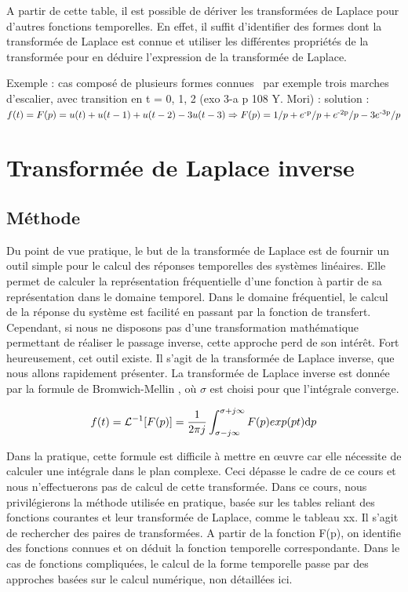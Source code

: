 \documentclass[]{book}
\begin{document}
{	A partir de cette table, il est possible de dériver les transformées de Laplace pour d'autres fonctions temporelles. En effet, il suffit d'identifier des formes dont la transformée de Laplace est connue et utiliser les différentes propriétés de la transformée pour en déduire l'expression de la transformée de Laplace.
	
	Exemple : cas composé de plusieurs formes connues~ par exemple trois
	marches d'escalier, avec transition en t = 0, 1, 2 (exo 3-a p 108 Y.
	Mori) : solution : $f(t) = F(p) = u(t) + u(t-1) + u(t-2) - 3u(t-3) \Rightarrow F(p)
	=1/p+e\textsuperscript{-p}/p+e\textsuperscript{-2p}/p-3e\textsuperscript{-3p}/p$
	
	
	\section{Transformée de Laplace inverse}
	\subsection{Méthode}
	Du point de vue pratique, le but de la transformée de Laplace est de fournir un outil simple pour le calcul des réponses temporelles des systèmes linéaires. Elle permet de calculer la représentation fréquentielle d'une fonction à partir de sa représentation dans le domaine temporel. Dans le domaine fréquentiel, le calcul de la réponse du système est facilité en passant par la fonction de transfert. Cependant, si nous ne disposons pas d'une transformation mathématique permettant de réaliser le passage inverse, cette approche perd de son intérêt.  Fort heureusement, cet outil existe. Il s'agit de la transformée de Laplace inverse, que nous allons rapidement présenter. 
	La transformée de Laplace inverse est donnée par la formule de Bromwich-Mellin , où $\sigma$ est choisi pour que l'intégrale converge.
	
	\begin{equation}\label{TL_inverse}
	f(t) = \mathcal{L}^{-1}[F(p)]=\frac{1}{2\pi j}\int_{\sigma - j\infty}^{\sigma + j\infty}F(p)exp(pt) \mathrm{d} p
	\end{equation}
	
	Dans la pratique, cette formule est difficile à mettre en œuvre car elle nécessite de calculer une intégrale dans le plan complexe. Ceci dépasse le cadre de ce cours et nous n'effectuerons pas de calcul de cette transformée. Dans ce cours, nous privilégierons la méthode utilisée en pratique, basée sur les tables reliant des fonctions courantes et leur transformée de Laplace, comme le tableau xx. Il s'agit de rechercher des paires de transformées. A partir de la fonction F(p), on identifie des fonctions connues et on déduit la fonction temporelle correspondante. Dans le cas de fonctions compliquées, le calcul de la forme temporelle passe par des approches basées sur le calcul numérique, non détaillées ici.
	
}
\end{document}
